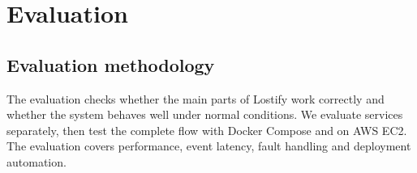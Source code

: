 \documentclass[11pt,a4paper]{article}
\begin{document}
\newpage

\section{Evaluation}

\subsection{Evaluation methodology}

The evaluation checks whether the main parts of Lostify work correctly and whether the system
behaves well under normal conditions. We evaluate services separately, then test the complete
flow with Docker Compose and on AWS EC2. The evaluation covers performance, event latency,
fault handling and deployment automation.

\begingroup
\small
\renewcommand{\arraystretch}{1.45}
\setlength{\tabcolsep}{7pt}
\end{document}
